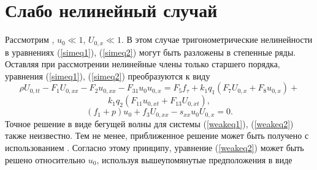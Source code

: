 \section{Слабо нелинейный случай}

Рассмотрим , $u_0 \ll 1$, $U_{0, x} \ll 1$. В этом случае тригонометрические нелинейности в уравнениях (\ref{simeq1}), (\ref{simeq2}) могут быть разложены в степенные ряды. Оставляя при рассмотрении нелинейные члены только старшего порядка, уравнения (\ref{simeq1}), (\ref{simeq2}) преобразуются к виду
\[
\rho U_{0,tt}- F_1 U_{0,xx}- F_2 u_{0,xx}-F_{31} u_0 u_{0,x}=F_5 f_\tau+k_1 q_1 (F_7 U_{0,x}+F_8 u_{0,x})+
\]
\begin{equation}
	k_1 q_2 (F_{11} u_{0,xt}+ F_{13} U_{0,xt}) , \label{weakeq1}
\end{equation}
\begin{equation}
	(f_1+p)u_0+f_3 U_{0,xx}-s_{xx} u_0 U_{0,x}=0. \label{weakeq2}
\end{equation}
Точное решение в виде бегущей волны для системы (\ref{weakeq1}), (\ref{weakeq2}) также неизвестно. Тем не менее, приближенное решение может быть получено с использованием  \cite{bound_porpas}. Согласно этому принципу, уравнение (\ref{weakeq2}) может быть решено относительно $u_0$, используя вышеупомянутые предположения в виде
